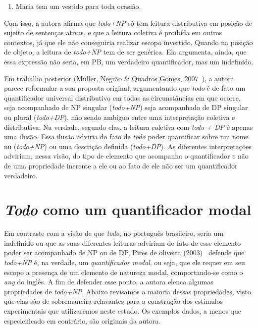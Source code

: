 \begin{enumerate}[resume]
    \item Maria tem um vestido para toda ocasião.
\end{enumerate}

Com isso, a autora afirma que \emph{todo+NP} só tem leitura distributiva em posição de sujeito de sentenças ativas, e que a leitura coletiva é proibida em outros contextos, já que ele não conseguiria realizar escopo invertido. Quando na posição de objeto, a leitura de \emph{todo+NP} tem de ser genérica. Ela argumenta, ainda, que essa expressão não seria, em PB, um verdadeiro quantificador, mas um indefinido.

Em trabalho posterior (Müller, Negrão \& Quadros Gomes, 2007~\cite{MullerETal2007}), a autora parece reformular a sua proposta original, argumentando que \emph{todo} é de fato um quantificador universal distributivo em todas as circunstâncias em que ocorre, seja acompanhado de NP singular (\emph{todo+NP}) seja acompanhado de DP singular ou plural (\emph{todo+DP}), não sendo ambíguo entre uma interpretação coletiva e distributiva. Na verdade, segundo elas, a leitura coletiva com \emph{todo + DP} é apenas uma ilusão. Essa ilusão adviria do fato de \emph{todo} poder quantificar sobre um nome nu (\emph{todo+NP}) ou uma descrição definida (\emph{todo+DP}). As diferentes interpretações adviriam, nessa visão, do tipo de elemento que acompanha o quantificador e não de uma propriedade inerente a ele ou ao fato de ele não ser um quantificador verdadeiro.

\section{\emph{Todo} como um quantificador modal}
Em contraste com a visão de que \emph{todo}, no português brasileiro, seria um indefinido ou que as suas diferentes leituras adviriam do fato de esse elemento poder ser acompanhado de NP ou de DP, Pires de oliveira (2003)~\cite{PiresOliv2003} defende que \emph{todo+NP} é, na verdade, um \emph{quantificador modal}, ou seja, que ele requer em seu escopo a presença de um elemento de natureza modal, comportando-se como o \emph{any} do inglês. A fim de defender esse ponto, a autora elenca algumas propriedades de \emph{todo+NP}. Abaixo revisamos a maioria dessas propriedades, visto que elas são de sobremaneira relavantes para a construção dos estímulos experimentais que utilizaremos neste estudo. Os exemplos dados, a menos que especicificado em contrário, são originais da autora.

